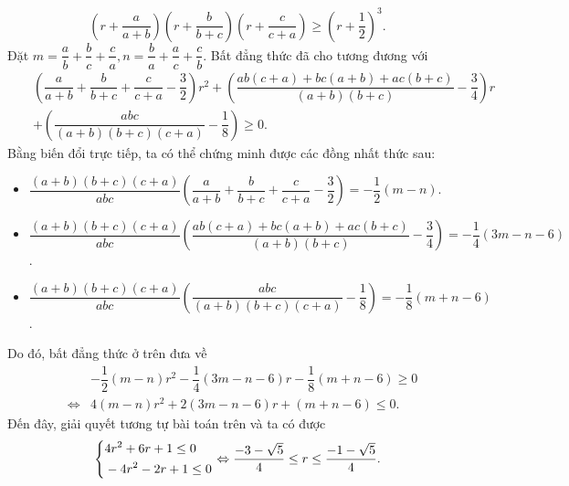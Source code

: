 \begin{bt}
{\begin{enumerate}
\begin{nx}
				$$ \left( r+\dfrac{a}{a+b} \right)\left( r+\dfrac{b}{b+c} \right)\left( r+\dfrac{c}{c+a} \right) \ge \left( r+\dfrac{1}{2} \right)^3. $$
				Đặt $ m=\dfrac{a}{b}+\dfrac{b}{c}+\dfrac{c}{a}, n=\dfrac{b}{a}+\dfrac{a}{c}+\dfrac{c}{b} $. Bất đẳng thức đã cho tương đương với
				\begin{eqnarray*}
					&&\left( \dfrac{a}{a+b}+\dfrac{b}{b+c}+\dfrac{c}{c+a}-\dfrac{3}{2} \right)r^2 + \left( \dfrac{ab(c+a)+bc(a+b)+ac(b+c)}{(a+b)(b+c)}-\dfrac{3}{4} \right)r \\
					&&+\left( \dfrac{abc}{(a+b)(b+c)(c+a)}-\dfrac{1}{8} \right) \ge 0.
				\end{eqnarray*}
				Bằng biến đổi trực tiếp, ta có thể chứng minh được các đồng nhất thức sau:
				\begin{itemize}
					\item $ \dfrac{(a+b)(b+c)(c+a)}{abc}\left( \dfrac{a}{a+b}+\dfrac{b}{b+c}+\dfrac{c}{c+a}-\dfrac{3}{2} \right) =-\dfrac{1}{2}(m-n) $.
					\item $ \dfrac{(a+b)(b+c)(c+a)}{abc}\left( \dfrac{ab(c+a)+bc(a+b)+ac(b+c)}{(a+b)(b+c)}-\dfrac{3}{4} \right) = -\dfrac{1}{4}(3m-n-6) $.
					\item $ \dfrac{(a+b)(b+c)(c+a)}{abc}\left( \dfrac{abc}{(a+b)(b+c)(c+a)}-\dfrac{1}{8} \right) = -\dfrac{1}{8}(m+n-6) $.
				\end{itemize}
				Do đó, bất đẳng thức ở trên đưa về
				\begin{eqnarray*}
					&&-\dfrac{1}{2}(m-n)r^2-\dfrac{1}{4}(3m-n-6)r-\dfrac{1}{8}(m+n-6) \ge 0 \\
					&\Leftrightarrow& 4(m-n)r^2+2(3m-n-6)r+(m+n-6) \le 0.
				\end{eqnarray*}
				Đến đây, giải quyết tương tự bài toán trên và ta có được
				$$ \left\{\begin{aligned}&4r^2+6r+1 \le 0 \\ &-4r^2-2r+1 \le 0\end{aligned}\right. \Leftrightarrow \dfrac{-3-\sqrt{5}}{4} \le r \le \dfrac{-1-\sqrt{5}}{4}. $$
			\end{nx}
		\end{enumerate}
	}
\end{bt}

